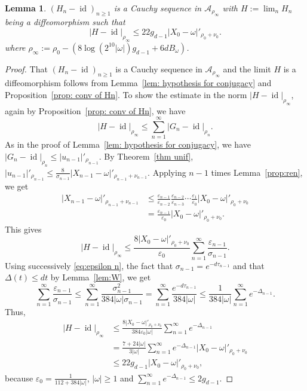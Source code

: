 \documentclass[12pt,reqno,a4paper]{amsart}%
\numberwithin{equation}{section}
\newtheorem{lemma}[theorem]{Lemma}
\newcommand{\A}{{\mathcal A}}
\newcommand{\id}  {\operatorname{id}}
\begin{document}
\begin{lemma}
$(H_{n}-\id)_{n\geq1}$ is a Cauchy sequence  in $\A_{\rho_{\infty}}$ with $H:=\lim_nH_n$ being  a diffeomorphism such that 
$$
|H-\id|_{\rho_\infty}\leq 22 g_{d-1}|X_{0}-\omega|'_{\rho_{0}+\nu_{0}}.
$$
where $\rho_\infty := \rho_0 - (8\log(2^{10}|\omega|)g_{d-1}+ 6d B_{\omega})$. 
\end{lemma}

\begin{proof}
That $(H_{n}-\id)_{n\geq1}$ is a Cauchy sequence in $\A_{\rho_{\infty}}$ and the limit $H$ is a diffeomorphism follows from Lemma~\ref{lem: hypothesis for conjugacy} and Proposition~\ref{prop: conv of Hn}. To show the estimate in the norm $|H-\id|_{\rho_\infty}$, again by Proposition~\ref{prop: conv of Hn}, we have
$$
|H-\id|_{\rho_\infty}\leq \sum_{n=1}^\infty |G_n-\id|_{\rho_n}.
$$
As in the proof of Lemma~\ref{lem: hypothesis for conjugacy}, we have $|G_n-\id|_{\rho_n}\leq |u_{n-1}|'_{\rho_{n-1}}$. By Theorem~\ref{thm unif}, $|u_{n-1}|'_{\rho_{n-1}}\leq \frac{8}{\sigma_{n-1}}|X_{n-1}-\omega|'_{\rho_{n-1}+\nu_{n-1}}$. Applying $n-1$ times Lemma~\ref{prop:ren}, we get
\begin{align*}
|X_{n-1}-\omega|'_{\rho_{n-1}+\nu_{n-1}}&\leq \frac{\varepsilon_{n-1}}{\varepsilon_{n-2}}\frac{\varepsilon_{n-2}}{\varepsilon_{n-3}}\cdots\frac{\varepsilon_1}{\varepsilon_0}|X_{0}-\omega|'_{\rho_{0}+\nu_{0}}\\
&=\frac{\varepsilon_{n-1}}{\varepsilon_{0}}|X_{0}-\omega|'_{\rho_{0}+\nu_{0}}.
\end{align*}
This gives
$$
|H-\id|_{\rho_\infty}\leq \frac{8|X_{0}-\omega|'_{\rho_{0}+\nu_{0}}}{\varepsilon_0}\sum_{n=1}^\infty  \frac{\varepsilon_{n-1}}{\sigma_{n-1}}.
$$
Using
successively \eqref{eq:epsilon n}, the fact that $\sigma_{n-1}=e^{-d\tau_{n-1}}$ and that $\Delta(t)\leq dt$ by
Lemma~\ref{lem:W}, we get
$$
\sum_{n=1}^\infty \frac{\varepsilon_{n-1}}{\sigma_{n-1}} \leq \sum_{n=1}^\infty \frac{\sigma_{n-1}^2}{384|\omega|\sigma_{n-1}} = \sum_{n=1}^\infty \frac{e^{-d\tau_{n-1}}}{384|\omega|}\leq\frac{1}{384|\omega|} \sum_{n=1}^\infty e^{-\Delta_{n-1}}.
$$
Thus,
\begin{align*}
|H-\id|_{\rho_\infty}&\leq \frac{8|X_{0}-\omega|'_{\rho_{0}+\nu_{0}}}{384\varepsilon_0|\omega|} \sum_{n=1}^\infty e^{-\Delta_{n-1}}\\
&= \frac{7+24|\omega|}{3|\omega|} \sum_{n=1}^\infty e^{-\Delta_{n-1}}|X_{0}-\omega|'_{\rho_{0}+\nu_{0}}\\
&\leq 22 g_{d-1}|X_{0}-\omega|'_{\rho_{0}+\nu_{0}},
\end{align*}
because $\varepsilon_0= \frac{1}{112+384|\omega|}$, $|\omega|\geq1$ and $\sum_{n=1}^\infty e^{-\Delta_{n-1}}\leq 2g_{d-1}$.
\end{proof}
\end{document}
